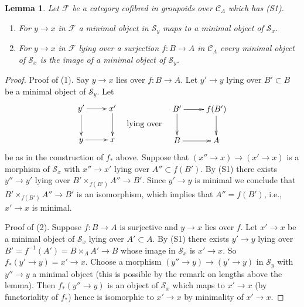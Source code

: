 \documentclass[10pt,a4paper]{amsart}
\theoremstyle{plain}
\newtheorem{lemma}[subsection]{Lemma}
\theoremstyle{definition}
\theoremstyle{remark}
\numberwithin{equation}{subsection}
\begin{document}
\begin{lemma}
\label{lemma-smallest-where-descends}
Let $\mathcal{F}$ be a category cofibred in groupoids over
$\mathcal{C}_\Lambda$ which has (S1).
\begin{enumerate}
\item For $y \to x$ in $\mathcal{F}$ a minimal
object in $\mathcal{S}_y$ maps to a minimal object of $\mathcal{S}_x$.
\item For $y \to x$ in $\mathcal{F}$ lying over a surjection
$f : B \to A$ in $\mathcal{C}_\Lambda$ every minimal object
of $\mathcal{S}_x$ is the image of a minimal object of
$\mathcal{S}_y$.
\end{enumerate}
\end{lemma}

\begin{proof}
Proof of (1). Say $y \to x$ lies over $f : B \to A$. Let $y' \to y$
lying over $B' \subset B$ be a minimal object of $\mathcal{S}_y$. Let
$$
\vcenter{
\xymatrix{
y' \ar[d] \ar[r] & x' \ar[d] \\
y \ar[r] & x
}
}
\quad\text{lying over}\quad
\vcenter{
\xymatrix{
B' \ar[d] \ar[r] & f(B') \ar[d] \\
B \ar[r] & A
}
}
$$
be as in the construction of $f_*$ above. Suppose that
$(x'' \to x) \to (x' \to x)$ is a morphism of $\mathcal{S}_x$
with $x'' \to x'$ lying over $A'' \subset f(B')$. By (S1)
there exists $y'' \to y'$ lying over $B' \times_{f(B')} A'' \to B'$.
Since $y' \to y$ is minimal we conclude that
$B' \times_{f(B')} A'' \to B'$ is an isomorphism, which implies that
$A'' = f(B')$, i.e., $x' \to x$ is minimal.

\medskip\noindent
Proof of (2). Suppose $f : B \to A$ is surjective and $y \to x$ lies over $f$.
Let $x' \to x$ be a minimal object of $\mathcal{S}_x$ lying over $A' \subset A$.
By (S1) there exists $y' \to y$ lying over
$B' = f^{-1}(A') = B \times_A A' \to B$ whose image in $\mathcal{S}_x$ is
$x' \to x$. So $f_*(y' \to y) = x' \to x$.
Choose a morphism $(y'' \to y) \to (y' \to y)$ in
$\mathcal{S}_y$ with $y'' \to y$ a minimal object (this is possible by
the remark on lengths above the lemma). Then $f_*(y'' \to y)$ is an
object of $\mathcal{S}_x$ which maps to $x' \to x$ (by functoriality of
$f_*$) hence is isomorphic to $x' \to x$ by minimality of $x' \to x$.
\end{proof}
\end{document}
